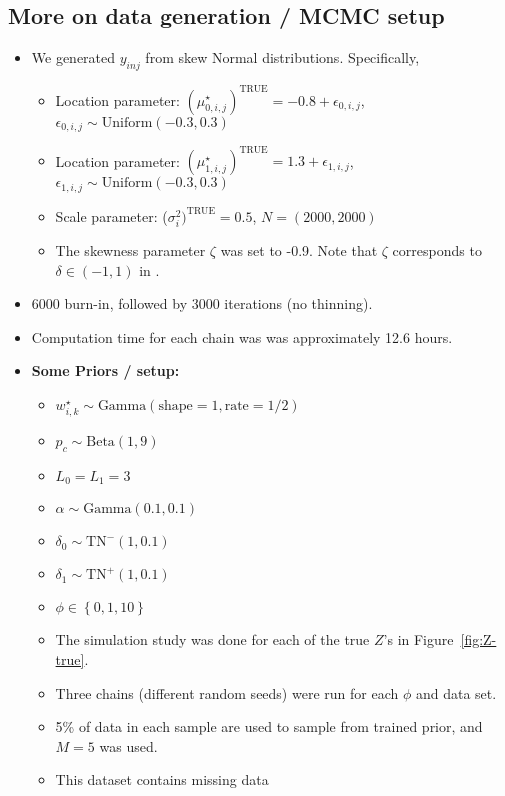 \documentclass[10pt]{article} %
\newcommand{\p}[1]{\left(#1\right)}
\newcommand{\bc}[1]{ \left\{#1\right\} }
\newcommand{\Gam}{ \text{Gamma} }
\newcommand{\InvGamma}{ \text{Inv-Gamma} }
\newcommand{\Uniform}{ \text{Uniform} }
\def\Dir{\text{Dirichlet}}
\def\TN{\text{TN}}
\def\true{\text{TRUE}}
\begin{document}
\subsection{More on data generation / MCMC setup}
\begin{itemize}
  \item We generated $y_{inj}$ from skew Normal distributions. Specifically,
  \begin{itemize}
    \item Location parameter: $(\mu_{0,i,j}^\star)^\true=-0.8 + \epsilon_{0,i,j}$, $\epsilon_{0,i,j} \sim \Uniform(-0.3, 0.3)$
    \item Location parameter: $(\mu_{1,i,j}^\star)^\true=1.3 + \epsilon_{1,i,j}$, $\epsilon_{1,i,j} \sim \Uniform(-0.3, 0.3)$
    \item Scale parameter: ($\sigma^2_i)^\true=0.5$, $N=(2000, 2000)$
    \item The skewness parameter $\zeta$ was set to -0.9. Note that $\zeta$
          corresponds to $\delta \in \p{-1, 1}$ in \cite{fruhwirth2010bayesian}.
  \end{itemize}
  \item 6000 burn-in, followed by 3000 iterations (no thinning).
  \item Computation time for each chain was was approximately 12.6 hours.
  \item \textbf{Some Priors / setup:}
  \begin{itemize}
    \item $w^\star_{i,k} \sim \Gam(\text{shape}=1, \text{rate}=1/2)$
    \item $p_c \sim \text{Beta}(1, 9)$
    \item $L_0=L_1=3$
    \item $\alpha \sim \Gam(0.1, 0.1)$
    \item $\delta_0 \sim \TN^-(1, 0.1)$
    \item $\delta_1 \sim \TN^+(1, 0.1)$
    \item $\phi \in \bc{0, 1, 10}$
    \item The simulation study was done for each of the true $Z$'s in 
          Figure~\ref{fig:Z-true}.
    \item Three chains (different random seeds) were run for each $\phi$ and data set.
    \item 5\% of data in each sample are used to sample from trained prior, and
      $M=5$ was used.
    \item This dataset contains missing data
  \end{itemize}
\end{itemize}
\end{document}
